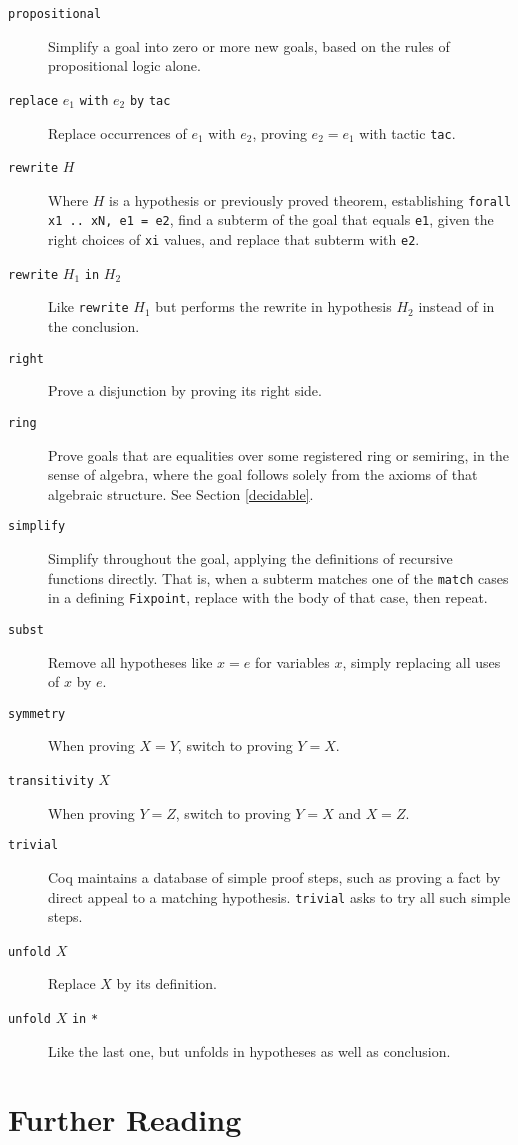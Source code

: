 \documentclass{amsbook}
\theoremstyle{definition}
\theoremstyle{remark}
\numberwithin{section}{chapter}
\numberwithin{equation}{chapter}
\begin{document}
\begin{description}
  \item[\texttt{propositional}] Simplify a goal into zero or more new goals, based on the rules of propositional logic alone.
  \item[\texttt{replace} $e_1$ \texttt{with} $e_2$ \texttt{by} \texttt{tac}] Replace occurrences of $e_1$ with $e_2$, proving $e_2 = e_1$ with tactic \texttt{tac}.
  \item[\texttt{rewrite} $H$] Where $H$ is a hypothesis or previously proved theorem, establishing \texttt{forall x1 .. xN, e1 = e2}, find a subterm of the goal that equals \texttt{e1}, given the right choices of \texttt{xi} values, and replace that subterm with \texttt{e2}.
  \item[\texttt{rewrite} $H_1$ \texttt{in} $H_2$] Like \texttt{rewrite} $H_1$ but performs the rewrite in hypothesis $H_2$ instead of in the conclusion.
  \item[\texttt{right}] Prove a disjunction by proving its right side.
  \item[\texttt{ring}] Prove goals that are equalities over some registered ring or semiring, in the sense of algebra, where the goal follows solely from the axioms of that algebraic structure.  See Section \ref{decidable}.
  \item[\texttt{simplify}] Simplify throughout the goal, applying the definitions of recursive functions directly.  That is, when a subterm matches one of the \texttt{match} cases in a defining \texttt{Fixpoint}, replace with the body of that case, then repeat.
  \item[\texttt{subst}] Remove all hypotheses like $x = e$ for variables $x$, simply replacing all uses of $x$ by $e$.
  \item[\texttt{symmetry}] When proving $X = Y$, switch to proving $Y = X$.
  \item[\texttt{transitivity} $X$] When proving $Y = Z$, switch to proving $Y = X$ and $X = Z$.
  \item[\texttt{trivial}] Coq maintains a database of simple proof steps, such as proving a fact by direct appeal to a matching hypothesis.  \texttt{trivial} asks to try all such simple steps.
  \item[\texttt{unfold} $X$] Replace $X$ by its definition.
  \item[\texttt{unfold} $X$ \texttt{in} \texttt{*}] Like the last one, but unfolds in hypotheses as well as conclusion.
\end{description}

\section{Further Reading}
\end{document}
